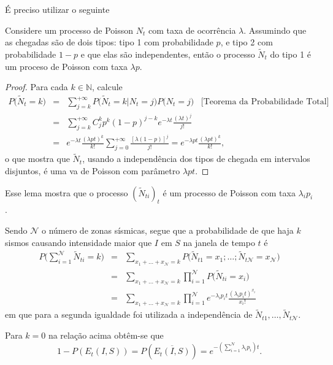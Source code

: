 É preciso utilizar o seguinte
\begin{lemma}
Considere um processo de Poisson $N_t$ com taxa de ocorrência $\lambda$.
Assumindo que as chegadas são de dois tipos: tipo 1 com probabilidade $p$,
e tipo 2 com probabilidade  $1 - p$ e que elas são independentes, 
então o processo $\tilde N_t$ do tipo 1 é um proceso de Poisson com taxa
$\lambda p$.
\end{lemma}
\begin{proof} Para cada $k \in \mathbb{N}$, calcule
$$
\begin{array}{lll}
P\Big(\tilde N_{t} =k \Big) & = & \displaystyle \sum_{j=k}^{+\infty} P\Big(\tilde N_{t} =k | N_{t}
=j\Big)  P \Big( N_{t} =j  \Big)\;\;\;\mbox{[Teorema da Probabilidade Total]}\\
&=& \displaystyle \sum_{j=k}^{+\infty} C_j^k p^k (1-p)^{j-k} e^{-\lambda t} \frac{(\lambda t)^j}{j!} \\
&=&e^{-\lambda t} \frac{(\lambda p t)^k}{k!} \displaystyle \sum_{j=0}^{+\infty} \frac{[\lambda (1-p)]^{j}}{j!} = e^{-\lambda p t} \frac{(\lambda p t)^k}{k!},
\end{array}
$$
o que mostra que $\tilde N_{t}$, usando a independência dos tipos de chegada em
intervalos disjuntos, é uma \gls{va} de Poisson com parâmetro
$\lambda p t$.\hfill
\end{proof}

Esse lema mostra que o processo $(\tilde N_{t i})_t$ é um processo de Poisson com taxa $\lambda_i p_i$.

Sendo $\mathcal{N}$ o número de zonas sísmicas, segue que a probabilidade de que haja $k$ sismos causando
intensidade maior que $I$ em $S$ na janela de tempo $t$ é
$$
\displaystyle
\begin{array}{lll}
P\Big(\displaystyle \sum_{i=1}^{\mathcal{N}} \tilde N_{t i} = k\Big)
&= &\displaystyle \sum_{x_1+\ldots +x_{\mathcal{N}}=k} P\Big(\tilde N_{t 1} = x_1; \ldots; \tilde N_{t \mathcal{N}} = x_{\mathcal{N}} \Big)\\
&= &\displaystyle{\sum_{x_1+\ldots +x_{\mathcal{N}}=k} \prod_{i=1}^{\mathcal{N}}}P\Big(\tilde N_{t i} = x_i \Big)\\
&= &\displaystyle \sum_{x_1+\ldots +x_{\mathcal{N}}=k} \prod_{i=1}^{\mathcal{N}} e^{-\lambda_i p_i t} \frac{(\lambda_i p_i t)^{x_i}}{x_{i}!}
\end{array}
$$
em que para a segunda igualdade foi utilizada a independência de  ${\tilde N}_{t 1}, \ldots, {\tilde N}_{t
\mathcal{N}}$.


Para $k=0$ na relação acima obtêm-se que
\begin{equation} \label{probinterest}
1-P( E_t(I, S) )= P(\overline{E_t(I, S)})=e^{-(\sum_{i=1}^{\mathcal{N}} \lambda_i p_i) t}.
\end{equation}

